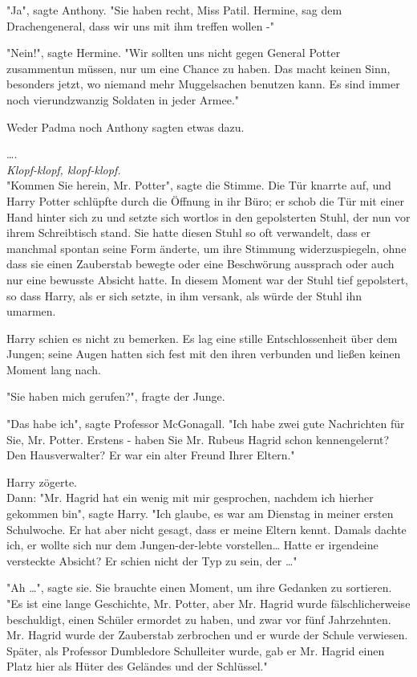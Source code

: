 {"Ja", sagte Anthony. "Sie haben recht, Miss Patil. Hermine, sag dem Drachengeneral, dass wir uns mit ihm treffen wollen -"

"Nein!", sagte Hermine. "Wir sollten uns nicht gegen General Potter zusammentun müssen, nur um eine Chance zu haben. Das macht keinen Sinn, besonders jetzt, wo niemand mehr Muggelsachen benutzen kann. Es sind immer noch vierundzwanzig Soldaten in jeder Armee."

Weder Padma noch Anthony sagten etwas dazu.

….\\ \emph{Klopf-klopf, klopf-klopf.}\\ "Kommen Sie herein, Mr. Potter", sagte die Stimme. Die Tür knarrte auf, und Harry Potter schlüpfte durch die Öffnung in ihr Büro; er schob die Tür mit einer Hand hinter sich zu und setzte sich wortlos in den gepolsterten Stuhl, der nun vor ihrem Schreibtisch stand. Sie hatte diesen Stuhl so oft verwandelt, dass er manchmal spontan seine Form änderte, um ihre Stimmung widerzuspiegeln, ohne dass sie einen Zauberstab bewegte oder eine Beschwörung aussprach oder auch nur eine bewusste Absicht hatte. In diesem Moment war der Stuhl tief gepolstert, so dass Harry, als er sich setzte, in ihm versank, als würde der Stuhl ihn umarmen.

Harry schien es nicht zu bemerken. Es lag eine stille Entschlossenheit über dem Jungen; seine Augen hatten sich fest mit den ihren verbunden und ließen keinen Moment lang nach.

"Sie haben mich gerufen?", fragte der Junge.

"Das habe ich", sagte Professor McGonagall. "Ich habe zwei gute Nachrichten für Sie, Mr. Potter. Erstens - haben Sie Mr. Rubeus Hagrid schon kennengelernt? Den Hausverwalter? Er war ein alter Freund Ihrer Eltern."

Harry zögerte.\\ Dann: "Mr. Hagrid hat ein wenig mit mir gesprochen, nachdem ich hierher gekommen bin", sagte Harry. "Ich glaube, es war am Dienstag in meiner ersten Schulwoche. Er hat aber nicht gesagt, dass er meine Eltern kennt. Damals dachte ich, er wollte sich nur dem Jungen-der-lebte vorstellen… Hatte er irgendeine versteckte Absicht? Er schien nicht der Typ zu sein, der …"

"Ah …", sagte sie. Sie brauchte einen Moment, um ihre Gedanken zu sortieren. "Es ist eine lange Geschichte, Mr. Potter, aber Mr. Hagrid wurde fälschlicherweise beschuldigt, einen Schüler ermordet zu haben, und zwar vor fünf Jahrzehnten. Mr. Hagrid wurde der Zauberstab zerbrochen und er wurde der Schule verwiesen. Später, als Professor Dumbledore Schulleiter wurde, gab er Mr. Hagrid einen Platz hier als Hüter des Geländes und der Schlüssel."

}
